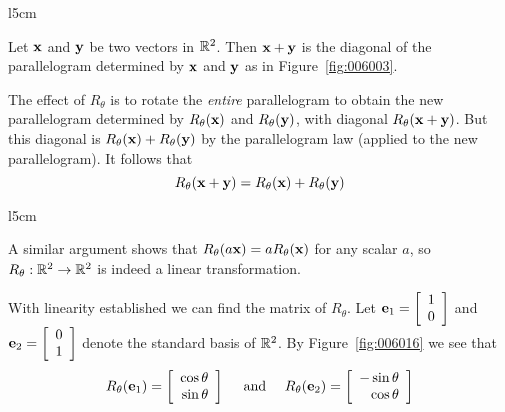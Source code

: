 \begin{wrapfigure}[11]{l}{5cm} 
\centering

\caption{\label{fig:006003}}
\end{wrapfigure}

Let $\textbf{x}$ and $\textbf{y}$ be two vectors in $\mathbb{R}^2$. Then $\textbf{x} + \textbf{y}$ is the diagonal of the parallelogram determined by $\textbf{x}$ and $\textbf{y}$ as in Figure~\ref{fig:006003}. 

\noindent The effect of $R_{\theta}$ is to rotate the \textit{entire} parallelogram to obtain the new parallelogram determined by $R_{\theta}(\textbf{x})$ and $R_{\theta}(\textbf{y})$, with diagonal $R_{\theta}(\textbf{x} + \textbf{y})$. But this diagonal is $R_{\theta}(\textbf{x}) + R_{\theta}(\textbf{y})$ by the parallelogram law (applied to the new parallelogram). It follows that
\begin{equation*}
R_{\theta}(\textbf{x} + \textbf{y}) = R_{\theta}(\textbf{x}) + R_{\theta}(\textbf{y})
\end{equation*}

\begin{wrapfigure}[9]{l}{5cm} 
\vspace*{-2em}
\centering

\caption{\label{fig:006016}}
\end{wrapfigure}

A similar argument shows that $R_{\theta}(a\textbf{x}) = aR_{\theta}(\textbf{x})$ for any scalar $a$, so $R_{\theta} : \mathbb{R}^2 \to \mathbb{R}^2$ is indeed a linear transformation.

With linearity established we can find the matrix of $R_{\theta}$. Let $\textbf{e}_{1} = \left[ \begin{array}{c}
1 \\
0
\end{array} \right]$
 and $\textbf{e}_{2} = \left[ \begin{array}{c}
 0 \\
 1
 \end{array} \right]$
 denote the standard basis of $\mathbb{R}^2$. By Figure~\ref{fig:006016} we see that
\begin{equation*}
R_{\theta}(\textbf{e}_{1}) = \left[ \begin{array}{r}
\cos \theta \\
\sin \theta
\end{array} \right] \quad \mbox{ and } \quad 
R_{\theta}(\textbf{e}_{2}) = \left[ \begin{array}{r}
-\sin \theta \\
\cos \theta
\end{array} \right]
\end{equation*}


